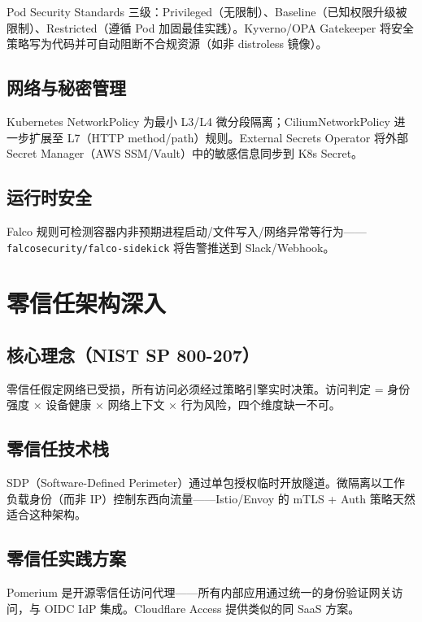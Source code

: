 \documentclass[12pt,UTF8]{ctexbook}
\begin{document}
Pod Security Standards 三级：Privileged（无限制）、Baseline（已知权限升级被限制）、Restricted（遵循 Pod 加固最佳实践）。Kyverno/OPA Gatekeeper 将安全策略写为代码并可自动阻断不合规资源（如非 distroless 镜像）。

  \section{网络与秘密管理}

Kubernetes NetworkPolicy 为最小 L3/L4 微分段隔离；CiliumNetworkPolicy 进一步扩展至 L7（HTTP method/path）规则。External Secrets Operator 将外部 Secret Manager（AWS SSM/Vault）中的敏感信息同步到 K8s Secret。

  \section{运行时安全}

Falco 规则可检测容器内非预期进程启动/文件写入/网络异常等行为——\verb|falcosecurity/falco-sidekick| 将告警推送到 Slack/Webhook。


\chapter{零信任架构深入}
\label{chap:zero-trust-deep}

  \section{核心理念（NIST SP 800-207）}

零信任假定网络已受损，所有访问必须经过策略引擎实时决策。访问判定 = 身份强度 × 设备健康 × 网络上下文 × 行为风险，四个维度缺一不可。

  \section{零信任技术栈}

SDP（Software-Defined Perimeter）通过单包授权临时开放隧道。微隔离以工作负载身份（而非 IP）控制东西向流量——Istio/Envoy 的 mTLS + Auth 策略天然适合这种架构。

  \section{零信任实践方案}

Pomerium 是开源零信任访问代理——所有内部应用通过统一的身份验证网关访问，与 OIDC IdP 集成。Cloudflare Access 提供类似的同 SaaS 方案。
\end{document}
